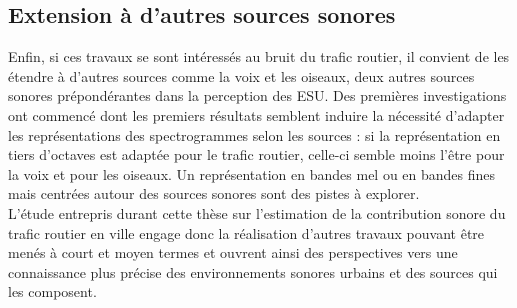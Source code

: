 \subsection*{Extension à d'autres sources sonores}
Enfin, si ces travaux se sont intéressés au bruit du trafic routier, il convient de les étendre à d'autres sources comme la voix et les oiseaux, deux autres sources sonores prépondérantes dans la perception des ESU. Des premières investigations ont commencé dont les premiers résultats semblent induire la nécessité d'adapter les représentations des spectrogrammes selon les sources : si la représentation en tiers d'octaves est adaptée pour le trafic routier, celle-ci semble moins l'être pour la voix et pour les oiseaux. Un représentation en bandes mel ou en bandes fines mais centrées autour des sources sonores sont des pistes à explorer. \\

L'étude entrepris durant cette thèse sur l'estimation de la contribution sonore du trafic routier en ville engage donc la réalisation d'autres travaux pouvant être menés à court et moyen termes et ouvrent ainsi des perspectives vers une connaissance plus précise des environnements sonores urbains et des sources qui les composent.






